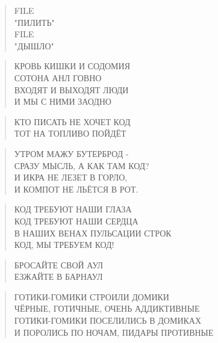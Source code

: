 \poemtitle{***}
\begin{verse}
FILE\\
  "ПИЛИТЬ"\\
FILE\\
  "ДЫШЛО"
\end{verse}

\poemtitle{***}
\begin{verse}
КРОВЬ КИШКИ И СОДОМИЯ\\
СОТОНА АНЛ ГОВНО\\
ВХОДЯТ И ВЫХОДЯТ ЛЮДИ\\
И МЫ С НИМИ ЗАОДНО
\end{verse}

\poemtitle{***}
\begin{verse}
КТО ПИСАТЬ НЕ ХОЧЕТ КОД\\
ТОТ НА ТОПЛИВО ПОЙДЁТ
\end{verse}

\poemtitle{***}
\begin{verse}
УТРОМ МАЖУ БУТЕРБРОД -\\
СРАЗУ МЫСЛЬ, А КАК ТАМ КОД?\\
И ИКРА НЕ ЛЕЗЕТ В ГОРЛО,\\
И КОМПОТ НЕ ЛЬЁТСЯ В РОТ.
\end{verse}

\poemtitle{***}
\begin{verse}
КОД ТРЕБУЮТ НАШИ ГЛАЗА\\
КОД ТРЕБУЮТ НАШИ СЕРДЦА\\
В НАШИХ ВЕНАХ ПУЛЬСАЦИИ СТРОК\\
КОД, МЫ ТРЕБУЕМ КОД!
\end{verse}

\poemtitle{***}
\begin{verse}
БРОСАЙТЕ СВОЙ АУЛ\\
ЕЗЖАЙТЕ В БАРНАУЛ
\end{verse}

\poemtitle{***}
\begin{verse}
ГОТИКИ-ГОМИКИ СТРОИЛИ ДОМИКИ\\
ЧЁРНЫЕ, ГОТИЧНЫЕ, ОЧЕНЬ АДДИКТИВНЫЕ\\
ГОТИКИ-ГОМИКИ ПОСЕЛИЛИСЬ В ДОМИКАХ\\
И ПОРОЛИСЬ ПО НОЧАМ, ПИДАРЫ ПРОТИВНЫЕ
\end{verse}

